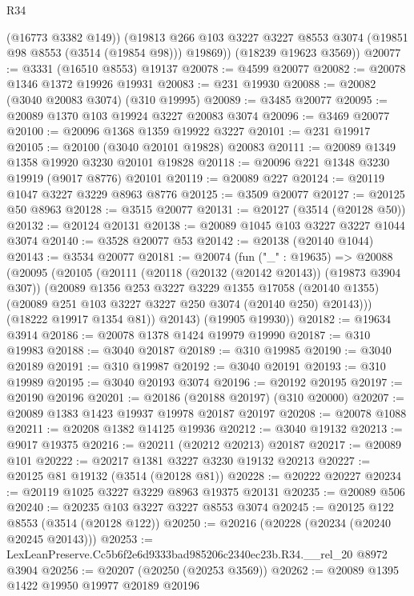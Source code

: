 \begin{lexlean}{R34}
\begin{coremodule}
          (@16773 @3382 @149))
        (@19813 @266 @103 @3227 @3227 @8553 @3074 (@19851 @98 @8553 (@3514 (@19854 @98))) @19869))
      (@18239 @19623 @3569))
@20077 := @3331 (@16510 @8553) @19137
@20078 := @4599 @20077
@20082 := @20078 @1346 @1372 @19926 @19931
@20083 := @231 @19930
@20088 := @20082 (@3040 @20083 @3074) (@310 @19995)
@20089 := @3485 @20077
@20095 := @20089 @1370 @103 @19924 @3227 @20083 @3074
@20096 := @3469 @20077
@20100 := @20096 @1368 @1359 @19922 @3227
@20101 := @231 @19917
@20105 := @20100 (@3040 @20101 @19828) @20083
@20111 := @20089 @1349 @1358 @19920 @3230 @20101 @19828
@20118 := @20096 @221 @1348 @3230 @19919 (@9017 @8776) @20101
@20119 := @20089 @227
@20124 := @20119 @1047 @3227 @3229 @8963 @8776
@20125 := @3509 @20077
@20127 := @20125 @50 @8963
@20128 := @3515 @20077
@20131 := @20127 (@3514 (@20128 @50))
@20132 := @20124 @20131
@20138 := @20089 @1045 @103 @3227 @3227 @1044 @3074
@20140 := @3528 @20077 @53
@20142 := @20138 (@20140 @1044)
@20143 := @3534 @20077
@20181 := @20074
    (fun ("_" : @19635) =>
    @20088
      (@20095
        (@20105
          (@20111
            (@20118 (@20132 (@20142 @20143)) (@19873 @3904 @307))
            (@20089
              @1356
              @253
              @3227
              @3229
              @1355
              @17058
              (@20140 @1355)
              (@20089 @251 @103 @3227 @3227 @250 @3074 (@20140 @250) @20143)))
          (@18222 @19917 @1354 @81))
        @20143)
      (@19905 @19930))
@20182 := @19634 @3914
@20186 := @20078 @1378 @1424 @19979 @19990
@20187 := @310 @19983
@20188 := @3040 @20187
@20189 := @310 @19985
@20190 := @3040 @20189
@20191 := @310 @19987
@20192 := @3040 @20191
@20193 := @310 @19989
@20195 := @3040 @20193 @3074
@20196 := @20192 @20195
@20197 := @20190 @20196
@20201 := @20186 (@20188 @20197) (@310 @20000)
@20207 := @20089 @1383 @1423 @19937 @19978 @20187 @20197
@20208 := @20078 @1088
@20211 := @20208 @1382 @14125 @19936
@20212 := @3040 @19132
@20213 := @9017 @19375
@20216 := @20211 (@20212 @20213) @20187
@20217 := @20089 @101
@20222 := @20217 @1381 @3227 @3230 @19132 @20213
@20227 := @20125 @81 @19132 (@3514 (@20128 @81))
@20228 := @20222 @20227
@20234 := @20119 @1025 @3227 @3229 @8963 @19375 @20131
@20235 := @20089 @506
@20240 := @20235 @103 @3227 @3227 @8553 @3074
@20245 := @20125 @122 @8553 (@3514 (@20128 @122))
@20250 := @20216 (@20228 (@20234 (@20240 @20245 @20143)))
@20253 := LexLeanPreserve.Cc5b6f2e6d9333bad985206c2340ec23b.R34.__rel_20 @8972 @3904
@20256 := @20207 (@20250 (@20253 @3569))
@20262 := @20089 @1395 @1422 @19950 @19977 @20189 @20196

\end{coremodule}
\end{lexlean}
